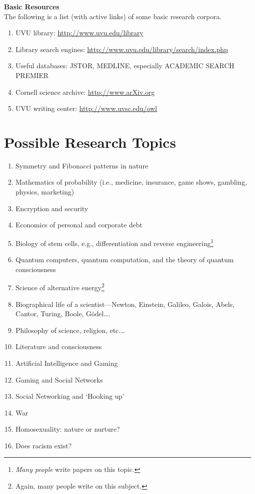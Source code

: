 \documentclass [11pt]{article}
\begin{document}
  
  {\bf Basic Resources}\\
  The following is a list (with active links) of some basic research corpora.
  \begin{enumerate}
\item UVU library: \href{http://www.uvu.edu/library}{http://www.uvu.edu/library}
\item Library search engines: \href{http://www.uvu.edu/library/search/index.php}{http://www.uvu.edu/library/search/index.php}
\item Useful databases: JSTOR, MEDLINE, especially ACADEMIC SEARCH PREMIER
\item Cornell science archive: \href{http://www.arXiv.org}{http://www.arXiv.org}
\item UVU writing center: \href{http://www.uvsc.edu/owl}{http://www.uvsc.edu/owl}
\end{enumerate}
   \vfill\eject

   


\section{Possible Research Topics}
\begin{enumerate}
\item Symmetry and Fibonacci patterns in nature
\item Mathematics of probability (i.e., medicine, insurance, game shows, gambling, physics, marketing)
\item Encryption and security
\item Economics of personal and corporate debt
\item Biology of stem cells, e.g., differentiation and reverse engineering\footnote{\emph{Many people} write papers on this topic.}
\item Quantum computers, quantum computation, and the theory of quantum consciousness
\item Science of alternative energy\footnote{Again, many people write on this subject.}
\item Biographical life of a scientist---Newton, Einstein, Galileo, Galois, Abels, Cantor, Turing, Boole, G\"odel\ldots{}.
\item Philosophy of science, religion, etc.\ldots
\item Literature and consciousness
\item Artificial Intelligence and Gaming
\item Gaming and Social Networks
\item Social Networking and `Hooking up'
\item War
\item Homosexuality: nature or nurture?
\item Does racism exist?
\end{enumerate}
\end{document}
